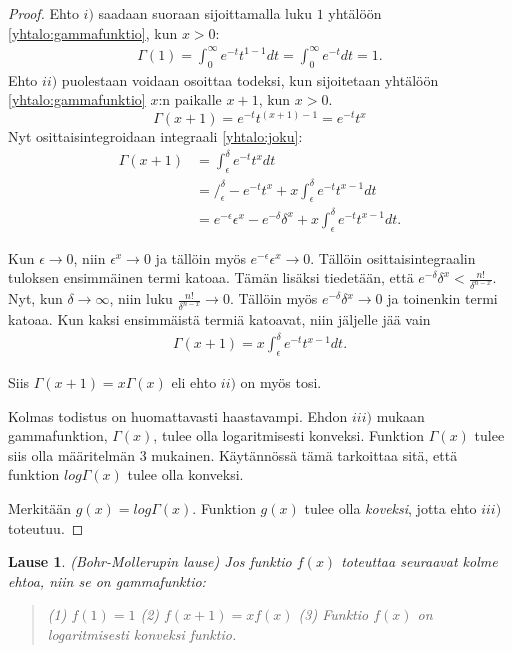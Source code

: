 \documentclass[12pt]{article}
\theoremstyle{definition}
\theoremstyle{plain}
\newtheorem{lause}[maar]{Lause}
\numberwithin{equation}{section}
\begin{document}
\begin{proof}
Ehto $i)$ saadaan suoraan sijoittamalla luku $1$ yhtälöön \eqref{yhtalo:gammafunktio}, kun $x>0$:
\begin{align*}
    \Gamma(1) = \int_0^\infty e^{-t}t^{1-1} dt = \int_0^\infty e^{-t}dt = 1.
\end{align*}
Ehto $ii)$ puolestaan voidaan osoittaa todeksi, kun sijoitetaan yhtälöön \eqref{yhtalo:gammafunktio} $x$:n paikalle $x+1$, kun $x>0$.
\begin{equation}\label{yhtalo:joku}
    \Gamma(x+1)=e^{-t}t^{(x+1)-1} = e^{-t}t^{x}
\end{equation}
Nyt osittaisintegroidaan integraali \eqref{yhtalo:joku}:
\begin{align*}
    \Gamma(x+1) & = \int_{\epsilon}^{\delta} e^{-t} t^{x} dt \\
    & = \Big/_\epsilon^\delta -e^{-t}t^{x}+x\int_\epsilon^\delta e^{-t}t^{x-1}dt \\
    & = e^{-\epsilon}\epsilon^{x}-e^{-\delta}\delta^{x}+x\int_\epsilon^\delta e^{-t}t^{x-1}dt.
\end{align*}

Kun $\epsilon\rightarrow0$, niin $\epsilon^x\rightarrow0$ ja tällöin myös $e^{-\epsilon}\epsilon^x \rightarrow0$. Tällöin osittaisintegraalin tuloksen ensimmäinen termi katoaa. Tämän lisäksi tiedetään, että $e^{-\delta}\delta^{x} < \frac{n!}{\delta^{n-x}}$. Nyt, kun $\delta\rightarrow\infty$, niin luku $\frac{n!}{\delta^{n-x}}\rightarrow0.$ Tällöin myös $e^{-\delta}\delta{^x}\rightarrow0$ ja toinenkin termi katoaa. Kun kaksi ensimmäistä termiä katoavat, niin jäljelle jää vain 
\begin{align*}
   \Gamma(x+1)=x\int_\epsilon^\delta e^{-t}t^{x-1}dt.
\end{align*}

Siis $\Gamma(x+1) = x\Gamma(x)$ eli ehto $ii)$ on myös tosi.\newline

Kolmas todistus on huomattavasti haastavampi. Ehdon $iii)$ mukaan gammafunktion, $\Gamma(x)$, tulee olla logaritmisesti konveksi. Funktion $\Gamma(x)$ tulee siis olla määritelmän 3 mukainen. Käytännössä tämä tarkoittaa sitä, että funktion $log\Gamma(x)$ tulee olla konveksi.\newline

Merkitään $g(x) = log\Gamma(x)$. Funktion $g(x)$ tulee olla \emph{koveksi}, jotta ehto $iii)$ toteutuu.
\end{proof}

\begin{lause}
(Bohr-Mollerupin lause)
\newline
Jos funktio $f(x)$ toteuttaa seuraavat kolme ehtoa, niin se on gammafunktio:
\begin{quote}
(1) $f(1)=1$ \newline
(2) $f(x+1)=xf(x)$ \newline
(3) Funktio $f(x)$ on logaritmisesti konveksi funktio.
\end{quote}
\end{lause}
\end{document}
